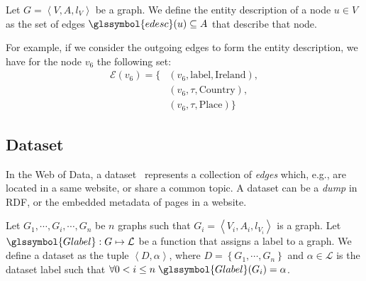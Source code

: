 \begin{definition}
Let $G = \left\langle V, A, l_V \right\rangle$ be a graph. We define the entity description of a node $u \in V$ as the set of edges $\glssymbol{edesc}(u) \subseteq A$ that describe that node.
\label{def:entity-description}
\end{definition}

For example, if we consider the outgoing edges to form the entity description, we have for the node $v_6$ the following set:
$$
\begin{aligned}
\mathcal{E}\left( v_6 \right) = \{ & \left( v_6, \text{label}, \text{Ireland} \right),\\
& \left( v_6, \tau, \text{Country} \right),\\
& \left( v_6, \tau, \text{Place} \right) \}
\end{aligned}
$$

\subsection{Dataset}
\label{sec:ssd:dataset}

In the Web of Data, a dataset~\cite{alexander:2009:dld} represents a collection of \emph{edges} which, e.g., are located in a same website, or share a common topic. A dataset can be a \emph{dump} in RDF, or the embedded metadata of pages in a website.

\begin{definition}[Dataset]
Let $G_1, \cdots, G_i, \cdots, G_n$ be $n$ graphs such that $G_i = \left\langle V_i, A_i, l_{V_i} \right\rangle$ is a graph.
Let $\glssymbol{Glabel} : G \mapsto \mathcal{L}$ be a function that assigns a label to a graph.
We define a dataset as the tuple $\left\langle D, \alpha \right\rangle$, where $D = \left\lbrace G_1, \cdots, G_n \right\rbrace$ and $\alpha \in \mathcal{L}$ is the dataset label such that $\forall 0 < i \le n\; \glssymbol{Glabel}(G_i) = \alpha$.
\end{definition}

